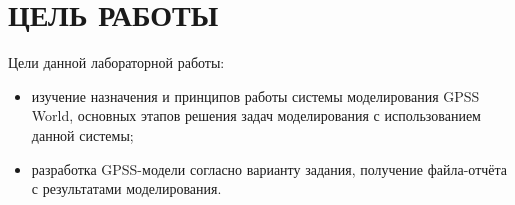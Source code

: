 \section{ЦЕЛЬ РАБОТЫ}

Цели данной лабораторной работы:

\begin{itemize}

\item
  изучение назначения и принципов работы системы моделирования GPSS World, основных
  этапов решения задач моделирования с использованием данной системы;
\item
  разработка GPSS-модели согласно варианту задания, получение файла-отчёта с результатами
  моделирования.

\end{itemize}

